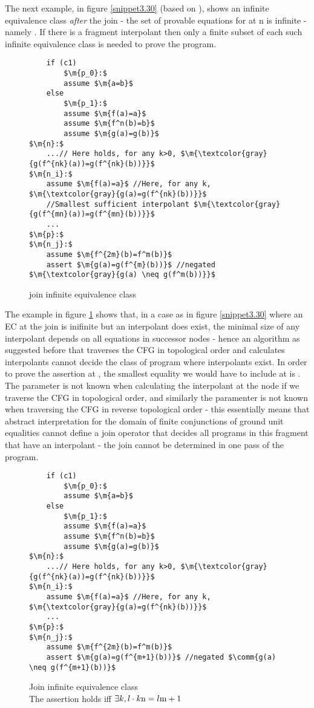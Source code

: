 The next example, in figure \ref{snippet3.30} (based on \cite{GulwaniTiwariNecula04}), shows an infinite equivalence class \emph{after} the join - the set of provable equations for  at n is infinite - namely . If there is a fragment interpolant then only a finite subset of each such infinite equivalence class is needed to prove the program.

\begin{figure}
\begin{lstlisting}
	if (c1)
		$\m{p_0}:$ 
		assume $\m{a=b}$
	else
		$\m{p_1}:$
		assume $\m{f(a)=a}$
		assume $\m{f^n(b)=b}$
		assume $\m{g(a)=g(b)}$
$\m{n}:$
	...// Here holds, for any k>0, $\m{\textcolor{gray}{g(f^{nk}(a))=g(f^{nk}(b))}}$
$\m{n_i}:$
	assume $\m{f(a)=a}$ //Here, for any k, $\m{\textcolor{gray}{g(a)=g(f^{nk}(b))}}$	
	//Smallest sufficient interpolant $\m{\textcolor{gray}{g(f^{mn}(a))=g(f^{mn}(b))}}$
	...
$\m{p}:$
$\m{n_j}:$
	assume $\m{f^{2m}(b)=f^m(b)}$ 
	assert $\m{g(a)=g(f^{m}(b))}$ //negated $\m{\textcolor{gray}{g(a) \neq g(f^m(b))}}$
\end{lstlisting}
\caption{join infinite equivalence class}
\label{snippet3.30a}
\end{figure}

The example in figure \ref{snippet3.30a} shows that, in a case as in figure \ref{snippet3.30} where an EC at the join is inifinite but an interpolant does exist, the minimal size of any interpolant depends on all equations in successor nodes - hence an algorithm as suggested before that traverses the CFG in topological order and calculates interpolants cannot decide the class of program where interpolants exist.
In order to prove the assertion at , the smallest equality we would have to include at  is .
The parameter  is not known when calculating the interpolant at the node  if we traverse the CFG in topological order,
and similarly the paramenter  is not known when traversing the CFG in reverse topological order - this essentially means that abstract interpretation for the domain of finite conjunctions of ground unit equalities cannot define a join operator that decides all programs in this fragment that have an interpolant - the join cannot be determined in one pass of the program.

\begin{figure}
\begin{lstlisting}
	if (c1)
		$\m{p_0}:$ 
		assume $\m{a=b}$
	else
		$\m{p_1}:$
		assume $\m{f(a)=a}$
		assume $\m{f^n(b)=b}$
		assume $\m{g(a)=g(b)}$
$\m{n}:$
	...// Here holds, for any k>0, $\m{\textcolor{gray}{g(f^{nk}(a))=g(f^{nk}(b))}}$
$\m{n_i}:$
	assume $\m{f(a)=a}$ //Here, for any k, $\m{\textcolor{gray}{g(a)=g(f^{nk}(b))}}$	
	...
$\m{p}:$
$\m{n_j}:$
	assume $\m{f^{2m}(b)=f^m(b)}$ 
	assert $\m{g(a)=g(f^{m+1}(b))}$ //negated $\comm{g(a) \neq g(f^{m+1}(b))}$
\end{lstlisting}
\caption{Join infinite equivalence class\\
The assertion holds iff $\exists k,l \cdot k\mathrm{n}=l\mathrm{m}+1$}
\label{snippet3.30b}
\end{figure}

